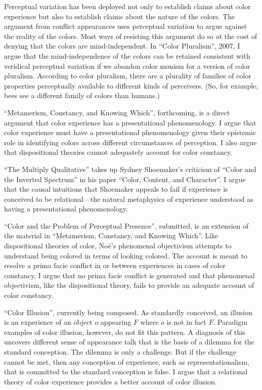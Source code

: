 \documentclass[contbibnum]{cv}
\begin{document}
Perceptual variation has been deployed not only to establish claims about color experience but also to establish claims about the nature of the colors. The argument from conflict appearances uses perceptual variation to argue against the reality of the colors. Most ways of resisting this argument do so at the cost of denying that the colors are mind-independent. In ``Color Pluralism'', 2007, I argue that the mind-independence of the colors can be retained consistent with veridical perceptual variation if we abandon color monism for a version of color pluralism. According to color pluralism, there are a plurality of families of color properties perceptually available to different kinds of perceivers. (So, for example, bees see a different family of colors than humans.)

``Metamerism, Constancy, and Knowing Which'', forthcoming, is a direct argument that color experience has a presentational phenomenology. I argue that color experience must have a presentational phenomenology given their epistemic role in identifying colors across different circumstances of perception. I also argue that dispositional theories cannot adequately account for color constancy.

``The Multiply Qualitative'' takes up Sydney Shoemaker's criticism of ``Color and the Inverted Spectrum'' in his paper ``Color, Content, and Character''. I argue that the causal intuitions that Shoemaker appeals to fail if experience is conceived to be relational---the natural metaphysics of experience understood as having a presentational phenomenology.

``Color and the Problem of Perceptual Presence'', submitted, is an extension of the material in ``Metamerism, Constancy, and Knowing Which''. Like dispositional theories of color, Noë's phenomenal objectivism attempts to understand being colored in terms of looking colored. The account is meant to resolve a prima facie conflict in or between experiences in cases of color constancy. I argue that no prima facie conflict is generated and that phenomenal objectivism, like the dispositional theory, fails to provide an adequate account of color constancy.

``Color Illusion'', currently being composed. As standardly conceived, an illusion is an experience of an object \( o \) appearing \( F \) where \( o \) is not in fact \( F \). Paradigm examples of color illusion, however, do not fit this pattern. A diagnosis of this uncovers different sense of appearance talk that is the basis of a dilemma for the standard conception. The dilemma is only a challenge. But if the challenge cannot be met, then any conception of experience, such as representationalism, that is committed to the standard conception is false. I argue that a relational theory of color experience provides a better account of color illusion.
\end{document}
